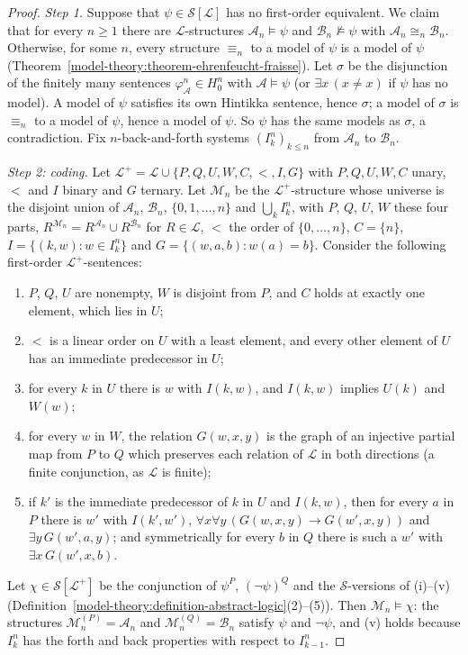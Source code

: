 \begin{proof}
\emph{Step 1.} Suppose that $\psi \in \mathcal{S}[\mathcal{L}]$ has no first-order equivalent. We claim that for every $n \geq 1$ there are $\mathcal{L}$-structures
$\mathcal{A}_n \models \psi$ and $\mathcal{B}_n \not\models \psi$ with $\mathcal{A}_n \cong_n \mathcal{B}_n$. Otherwise, for some $n$, every structure $\equiv_n$ to a
model of $\psi$ is a model of $\psi$ (Theorem~\ref{model-theory:theorem-ehrenfeucht-fraisse}). Let $\sigma$ be the disjunction of the finitely many sentences
$\varphi^n_{\mathcal{A}} \in H^n_0$ with $\mathcal{A} \models \psi$ (or $\exists x\,(x \neq x)$ if $\psi$ has no model). A model of $\psi$ satisfies its own Hintikka
sentence, hence $\sigma$; a model of $\sigma$ is $\equiv_n$ to a model of $\psi$, hence a model of $\psi$. So $\psi$ has the same models as $\sigma$, a
contradiction. Fix $n$-back-and-forth systems $(I^n_k)_{k \leq n}$ from $\mathcal{A}_n$ to $\mathcal{B}_n$.

\emph{Step 2: coding.} Let $\mathcal{L}^+ = \mathcal{L} \cup \{P, Q, U, W, C, <, I, G\}$ with $P, Q, U, W, C$ unary, $<$ and $I$ binary and $G$ ternary. Let
$\mathcal{M}_n$ be the $\mathcal{L}^+$-structure whose universe is the disjoint union of $\mathcal{A}_n$, $\mathcal{B}_n$, $\{0, 1, \ldots, n\}$ and
$\bigcup_kI^n_k$, with $P$, $Q$, $U$, $W$ these four parts, $R^{\mathcal{M}_n} = R^{\mathcal{A}_n} \cup R^{\mathcal{B}_n}$ for $R \in \mathcal{L}$, $<$ the order of
$\{0, \ldots, n\}$, $C = \{n\}$, $I = \{(k, w) : w \in I^n_k\}$ and $G = \{(w, a, b) : w(a) = b\}$. Consider the following first-order $\mathcal{L}^+$-sentences:
\begin{enumerate}
\item[(i)] $P$, $Q$, $U$ are nonempty, $W$ is disjoint from $P$, and $C$ holds at exactly one element, which lies in $U$;
\item[(ii)] $<$ is a linear order on $U$ with a least element, and every other element of $U$ has an immediate predecessor in $U$;
\item[(iii)] for every $k$ in $U$ there is $w$ with $I(k, w)$, and $I(k, w)$ implies $U(k)$ and $W(w)$;
\item[(iv)] for every $w$ in $W$, the relation $G(w, x, y)$ is the graph of an injective partial map from $P$ to $Q$ which preserves each relation of
$\mathcal{L}$ in both directions (a finite conjunction, as $\mathcal{L}$ is finite);
\item[(v)] if $k'$ is the immediate predecessor of $k$ in $U$ and $I(k, w)$, then for every $a$ in $P$ there is $w'$ with $I(k', w')$,
$\forall x\forall y\,(G(w, x, y) \to G(w', x, y))$ and $\exists y\,G(w', a, y)$; and symmetrically for every $b$ in $Q$ there is such a $w'$ with
$\exists x\,G(w', x, b)$.
\end{enumerate}
Let $\chi \in \mathcal{S}[\mathcal{L}^+]$ be the conjunction of $\psi^P$, $(\neg\psi)^Q$ and the $\mathcal{S}$-versions of (i)--(v)
(Definition~\ref{model-theory:definition-abstract-logic}(2)--(5)). Then $\mathcal{M}_n \models \chi$: the structures $\mathcal{M}_n^{(P)} = \mathcal{A}_n$ and
$\mathcal{M}_n^{(Q)} = \mathcal{B}_n$ satisfy $\psi$ and $\neg\psi$, and (v) holds because $I^n_k$ has the forth and back properties with respect to $I^n_{k-1}$.


\end{proof}
